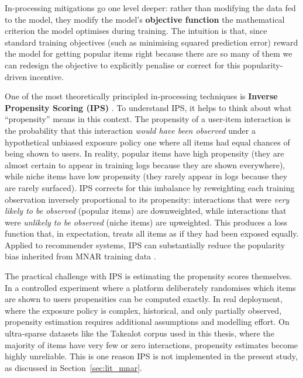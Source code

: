\documentclass[11pt,a4paper]{report}
\begin{document}
In-processing mitigations go one level deeper: rather than modifying the data fed to the model, they modify the model's \textbf{objective function} the mathematical criterion the model optimises during training. The intuition is that, since standard training objectives (such as minimising squared prediction error) reward the model for getting popular items right because there are so many of them we can redesign the objective to explicitly penalise or correct for this popularity-driven incentive.

One of the most theoretically principled in-processing techniques is \textbf{Inverse Propensity Scoring (IPS)} \citep{schnabel2016ips}. To understand IPS, it helps to think about what ``propensity'' means in this context. The propensity of a user-item interaction is the probability that this interaction \emph{would have been observed} under a hypothetical unbiased exposure policy one where all items had equal chances of being shown to users. In reality, popular items have high propensity (they are almost certain to appear in training logs because they are shown everywhere), while niche items have low propensity (they rarely appear in logs because they are rarely surfaced). IPS corrects for this imbalance by reweighting each training observation inversely proportional to its propensity: interactions that were \emph{very likely to be observed} (popular items) are downweighted, while interactions that were \emph{unlikely to be observed} (niche items) are upweighted. This produces a loss function that, in expectation, treats all items as if they had been exposed equally. Applied to recommender systems, IPS can substantially reduce the popularity bias inherited from MNAR training data \citep{schnabel2016ips}.

The practical challenge with IPS is estimating the propensity scores themselves. In a controlled experiment where a platform deliberately randomises which items are shown to users propensities can be computed exactly. In real deployment, where the exposure policy is complex, historical, and only partially observed, propensity estimation requires additional assumptions and modelling effort. On ultra-sparse datasets like the Takealot corpus used in this thesis, where the majority of items have very few or zero interactions, propensity estimates become highly unreliable. This is one reason IPS is not implemented in the present study, as discussed in Section~\ref{sec:lit_mnar}.
\end{document}
